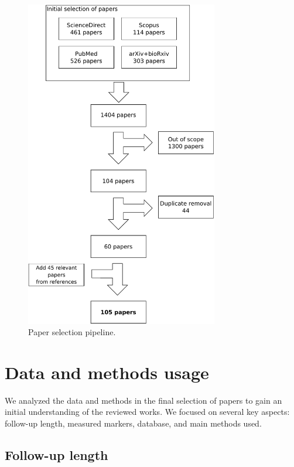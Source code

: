 \begin{figure}[!htbp]
  \centering
  \includegraphics[width=0.75\textwidth]{figures/review/Fig1.pdf}
  \caption{Paper selection pipeline.}
  \label{fig:search}
\end{figure}

\section{Data and methods usage}
\label{sec:longdata}

We analyzed the data and methods in the final selection of papers to gain an initial understanding of the reviewed works. We focused on several key aspects: follow-up length, measured markers, database, and main methods used. \\

\subsection{Follow-up length} 
 
